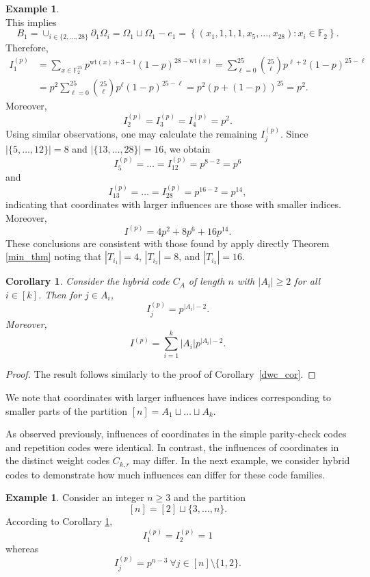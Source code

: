 \documentclass[12pt]{article}
\newcommand{\F}{\mathbb{F}}
\newcommand{\wt}{\mathrm{wt}}
\def\F{\mathbb F}
\newtheorem{corollary}[theorem]{Corollary}
\theoremstyle{definition}
\newtheorem{example}[theorem]{Example}
\begin{document}
\begin{example}
$$$$
This implies 
$$
B_1= \cup_{i \in \{ 2, \dots, 28 \}} \partial_1 \Omega_i = \Omega_1 \sqcup \Omega_1-e_1
=\left\{ (x_1, 1, 1, 1, x_5, \dots, x_{28})\colon x_i \in \F_2\right\}.$$
Therefore, 
\begin{align*}
I_1^{(p)}&=\sum_{x \in \F_2^{25}} p^{\wt(x)+3-1}(1-p)^{28-\wt(x)}=\sum_{\ell =0}^{25} \binom{25}{\ell}p^{\ell + 2}(1-p)^{25-\ell}\\ 
&=p^2 
\sum_{\ell =0}^{25} \binom{25}{\ell}p^{\ell }(1-p)^{25-\ell}=p^2(p+(1-p))^{25}=p^2.
\end{align*}
Moreover, $$I_2^{(p)}=I_3^{(p)}=I_4^{(p)}=p^2.$$Using similar observations, one may calculate the remaining $I_j^{(p)}$. Since $| \{ 5, \dots, 12 \} | = 8$ and $| \{ 13, \dots, 28 \} | =16$, we obtain 
$$I_5^{(p)}=\dots=I_{12}^{(p)}=p^{8-2}=p^6$$
and 
$$I_{13}^{(p)}=\dots=I_{28}^{(p)}=p^{16-2}=p^{14},$$ indicating that coordinates with 
larger influences are those with smaller indices. Moreover, 
$$I^{(p)}=4p^2+8p^6+16p^{14}.$$
These conclusions are consistent with those found by apply directly Theorem \ref{min_thm} noting that 
$| T_{i_1} | =4$, 
$| T_{i_2} | =8$, and $| T_{i_3} | =16$.
\end{example}

\begin{corollary} \label{hybrid_inf_cor}
Consider the hybrid code $C_A$ of length $n$ with $| A_i | \geq 2$ for all $i \in [k]$. Then for $j \in A_i$, $$I_j^{(p)}=p^{|A_i|-2}.$$ 
Moreover, 
$$I^{(p)}=\sum_{i=1}^k | A_i | p^{| A_i | -2}.$$
\end{corollary}

\begin{proof}
The result follows similarly to the proof of Corollary~\ref{dwc_cor}.
\end{proof}


We note that coordinates with larger influences have indices corresponding to smaller parts of the partition $[n]=A_1 \sqcup \dots \sqcup A_k$.

As observed previously, influences of coordinates in the simple parity-check codes and repetition codes were identical. In contrast, the influences of coordinates in the distinct weight codes $C_{k,r}$ may differ. In the next example, we consider hybrid codes to demonstrate how much influences can differ for these code families.  

\begin{example}
    Consider an integer $n \geq 3$ and the partition 
    $$[n]=[2] \sqcup \{ 3, \dots, n \}.$$
    According to Corollary \ref{hybrid_inf_cor}, 
    $$I_1^{(p)}=I_2^{(p)}=1$$ whereas
    $$I_j^{(p)}=p^{n-3} \ \forall j \in [n] \setminus \{ 1, 2 \}.$$
\end{example}
\end{document}
